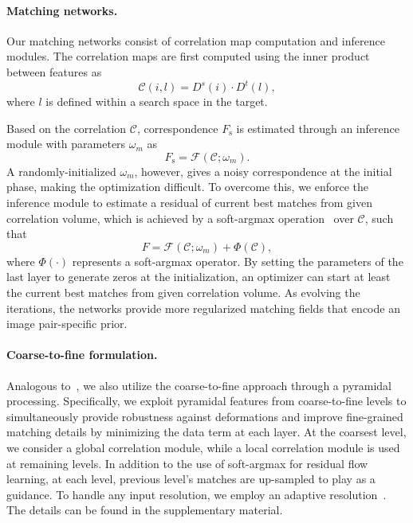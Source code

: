 \documentclass[10pt,twocolumn,letterpaper]{article}
\begin{document}
\paragraph{Matching networks.}
Our matching networks consist of correlation map computation and inference modules. The correlation maps are first computed using the inner product between features as
\begin{equation}
\mathcal{C}(i,l)={D^{s}(i)}\cdot D^{t}(l),
\end{equation}
where $l$ is defined within a search space in the target. 

Based on the correlation $\mathcal{C}$, correspondence $F_\mathrm{s}$ is estimated through an inference module with parameters $\omega_m$ as
\begin{equation}
F_\mathrm{s} = \mathcal{F}(\mathcal{C};\omega_m). 
\end{equation}
A randomly-initialized $\omega_m$, however, gives a noisy correspondence at the initial phase, making the optimization difficult. To overcome this, we enforce the inference module to estimate a residual of current best matches from given correlation volume, which is achieved by a soft-argmax operation~\cite{Kendall_2017_ICCV} over $\mathcal{C}$, such that
\begin{equation}
F = \mathcal{F}(\mathcal{C};\omega_m) + \Phi(\mathcal{C}),  
\end{equation}
where $\Phi(\cdot)$ represents a soft-argmax operator. 
By setting the parameters of the last layer to generate zeros at the initialization, an optimizer can start at least the current best matches from given correlation volume. As evolving the iterations, the networks provide more regularized matching fields that encode an image pair-specific prior. 
\vspace{-10pt}

\paragraph{Coarse-to-fine formulation.}
Analogous to~\cite{Sun_2018_CVPR,sun2018pwc,jeon2018parn,melekhov2019dgc,truong2020glu}, we also utilize the coarse-to-fine approach through a pyramidal processing. Specifically, we exploit pyramidal features from coarse-to-fine levels to simultaneously provide robustness against deformations and improve fine-grained matching details by minimizing the data term at each layer. At the coarsest level, we consider a global correlation module, while a local correlation module is used at remaining levels. In addition to the use of  soft-argmax for residual flow learning, at each level, previous level's matches are up-sampled to play as a guidance. To handle any input resolution, we employ an adaptive resolution~\cite{truong2020glu}. The details can be found in the supplementary material.
\end{document}
